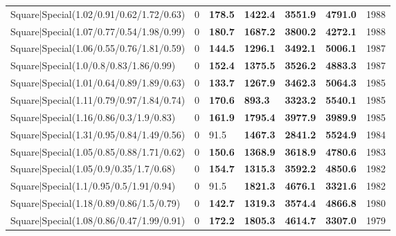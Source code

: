 \begin{tabular}{lrllllr}
 Square|Special(1.02/0.91/0.62/1.72/0.63)                      &             0   & \textbf{178.5} & \textbf{1422.4} & \textbf{3551.9} & \textbf{4791.0} &         1988 \\
 Square|Special(1.07/0.77/0.54/1.98/0.99)                      &             0   & \textbf{180.7} & \textbf{1687.2} & \textbf{3800.2} & \textbf{4272.1} &         1988 \\
 Square|Special(1.06/0.55/0.76/1.81/0.59)                      &             0   & \textbf{144.5} & \textbf{1296.1} & \textbf{3492.1} & \textbf{5006.1} &         1987 \\
 Square|Special(1.0/0.8/0.83/1.86/0.99)                        &             0   & \textbf{152.4} & \textbf{1375.5} & \textbf{3526.2} & \textbf{4883.3} &         1987 \\
 Square|Special(1.01/0.64/0.89/1.89/0.63)                      &             0   & \textbf{133.7} & \textbf{1267.9} & \textbf{3462.3} & \textbf{5064.3} &         1985 \\
 Square|Special(1.11/0.79/0.97/1.84/0.74)                      &             0   & \textbf{170.6} & \textbf{893.3}  & \textbf{3323.2} & \textbf{5540.1} &         1985 \\
 Square|Special(1.16/0.86/0.3/1.9/0.83)                        &             0   & \textbf{161.9} & \textbf{1795.4} & \textbf{3977.9} & \textbf{3989.9} &         1985 \\
 Square|Special(1.31/0.95/0.84/1.49/0.56)                      &             0   & 91.5           & \textbf{1467.3} & \textbf{2841.2} & \textbf{5524.9} &         1984 \\
 Square|Special(1.05/0.85/0.88/1.71/0.62)                      &             0   & \textbf{150.6} & \textbf{1368.9} & \textbf{3618.9} & \textbf{4780.6} &         1983 \\
 Square|Special(1.05/0.9/0.35/1.7/0.68)                        &             0   & \textbf{154.7} & \textbf{1315.3} & \textbf{3592.2} & \textbf{4850.6} &         1982 \\
 Square|Special(1.1/0.95/0.5/1.91/0.94)                        &             0   & 91.5           & \textbf{1821.3} & \textbf{4676.1} & \textbf{3321.6} &         1982 \\
 Square|Special(1.18/0.89/0.86/1.5/0.79)                       &             0   & \textbf{142.7} & \textbf{1319.3} & \textbf{3574.4} & \textbf{4866.8} &         1980 \\
 Square|Special(1.08/0.86/0.47/1.99/0.91)                      &             0   & \textbf{172.2} & \textbf{1805.3} & \textbf{4614.7} & \textbf{3307.0} &         1979 \\

\end{tabular}
